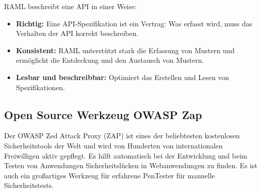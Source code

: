 RAML beschreibt eine API in einer Weise:

\begin{itemize}
	
	\item \textbf{Richtig:} Eine API-Spezifikation ist ein Vertrag: Was erfasst wird, muss das Verhalten der API korrekt beschreiben.
	
	\item \textbf{Konsistent:} RAML unterstützt stark die Erfassung von Mustern und ermöglicht die Entdeckung und den Austausch von Mustern.
	
	\item \textbf{Lesbar und beschreibbar:} Optimiert das Erstellen und Lesen von Spezifikationen.
	
\end{itemize}

\subsection{Open Source Werkzeug OWASP Zap}

Der OWASP Zed Attack Proxy (ZAP) ist eines der beliebtesten kostenlosen Sicherheitstools der Welt und wird von Hunderten von internationalen Freiwilligen aktiv gepflegt. Es hilft automatisch bei der Entwicklung und beim Testen von Anwendungen Sicherheitslücken in Webanwendungen zu finden. Es ist auch ein großartiges Werkzeug für erfahrene PenTester für manuelle Sicherheitstests\cite{owasp18def}.

